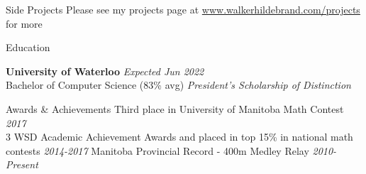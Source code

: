 \documentclass{resume} %
\newcommand{\award}[2]{#1 \hfill {\em #2}}
\begin{document}
\begin{rSection}{Side Projects}
    Please see my projects page at \href{http://www.walkerhildebrand.com/projects}{www.walkerhildebrand.com/projects} for more

\end{rSection}


\begin{rSection}{Education}

    {\bf University of Waterloo} \hfill {\em Expected Jun 2022} \\
    Bachelor of Computer Science (83\% avg) \hfill {\em President's Scholarship of Distinction}
    
\end{rSection}


\begin{rSection}{Awards \& Achievements}
    \award{Third place in University of Manitoba Math Contest}{2017} \\
    \award{3 WSD Academic Achievement Awards and placed in top 15\% in national math contests}{2014-2017}
    \award{Manitoba Provincial Record - 400m Medley Relay } {2010-Present}
\end{rSection}


    
    
\end{document}
